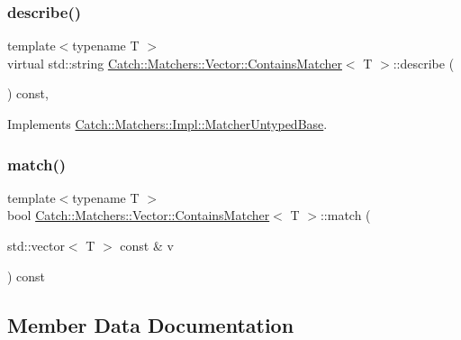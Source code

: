 \subsubsection{\texorpdfstring{describe()}{describe()}}
{\footnotesize\ttfamily template$<$typename T $>$ \\
virtual std\+::string \mbox{\hyperlink{struct_catch_1_1_matchers_1_1_vector_1_1_contains_matcher}{Catch\+::\+Matchers\+::\+Vector\+::\+Contains\+Matcher}}$<$ T $>$\+::describe (\begin{DoxyParamCaption}{ }\end{DoxyParamCaption}) const\hspace{0.3cm}{\ttfamily [inline]}, {\ttfamily [virtual]}}



Implements \mbox{\hyperlink{class_catch_1_1_matchers_1_1_impl_1_1_matcher_untyped_base_a91d3a907dbfcbb596077df24f6e11fe2}{Catch\+::\+Matchers\+::\+Impl\+::\+Matcher\+Untyped\+Base}}.

\mbox{\label{struct_catch_1_1_matchers_1_1_vector_1_1_contains_matcher_aba81516816a6796124dd4fe4843e7284}} 
\subsubsection{\texorpdfstring{match()}{match()}}
{\footnotesize\ttfamily template$<$typename T $>$ \\
bool \mbox{\hyperlink{struct_catch_1_1_matchers_1_1_vector_1_1_contains_matcher}{Catch\+::\+Matchers\+::\+Vector\+::\+Contains\+Matcher}}$<$ T $>$\+::match (\begin{DoxyParamCaption}\item[{std\+::vector$<$ T $>$ const \&}]{v }\end{DoxyParamCaption}) const\hspace{0.3cm}{\ttfamily [inline]}}



\subsection{Member Data Documentation}
\mbox{\label{struct_catch_1_1_matchers_1_1_vector_1_1_contains_matcher_a83d051166e4ed0d535219ad6ee99abb2}} 
